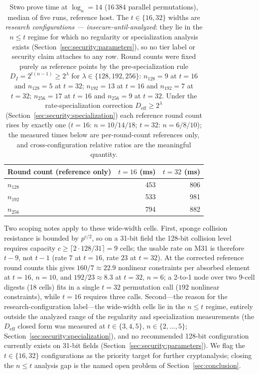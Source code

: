 \documentclass[11pt,a4paper]{article}
\theoremstyle{definition}
\begin{document}
\begin{table}[H]
\centering
\caption{Stwo prove time at $\log_n = 14$ (16\,384 parallel
permutations), median of five runs, reference host. The
$t \in \{16, 32\}$ widths are \emph{research configurations ---
insecure-until-analyzed}: they lie in the $n \le t$ regime for which
no regularity or specialization analysis exists
(Section~\ref{sec:security:parameters}), so no tier label or
security claim attaches to any row. Round counts were fixed purely
as reference points by the pre-specialization rule
$D_I = 2^{t(n-1)} \ge
2^{\lambda}$ for $\lambda \in \{128, 192, 256\}$: $n_{128} = 9$ at
$t=16$ and $n_{128} = 5$ at $t=32$;
$n_{192} = 13$ at $t=16$ and $n_{192} = 7$ at $t=32$;
$n_{256} = 17$ at $t=16$ and $n_{256} = 9$ at $t=32$. Under the
rate-specialization correction $D_{\mathrm{eff}} \ge 2^{\lambda}$
(Section~\ref{sec:security:specialization}) each reference round
count rises by exactly one ($t=16$: $n = 10/14/18$; $t=32$:
$n = 6/8/10$);
the measured times below are per-round-count references only,
and cross-configuration relative ratios are the meaningful quantity.}
\label{tab:perf-stwo}
\small
\begin{tabular}{@{}lrr@{}}
\toprule
Round count (reference only) & $t = 16$ (ms) & $t = 32$ (ms) \\
\midrule
$n_{128}$ & 453 & 806 \\
$n_{192}$ & 533 & 981 \\
$n_{256}$ & 794 & 882 \\
\bottomrule
\end{tabular}
\end{table}

Two scoping notes apply to these wide-width cells. First, sponge
collision resistance is bounded by $p^{c/2}$, so on a 31-bit field
the 128-bit collision level requires capacity
$c \ge \lceil 2 \cdot 128 / 31 \rceil = 9$ cells; the usable rate on
M31 is therefore $t - 9$, not $t - 1$ (rate $7$ at $t = 16$, rate
$23$ at $t = 32$). At the corrected reference round counts this gives
$160/7 \approx 22.9$ nonlinear constraints per absorbed element at
$t = 16$, $n = 10$, and $192/23 \approx 8.3$ at $t = 32$, $n = 6$; a
2-to-1 node over two 9-cell digests (18 cells) fits in a single
$t = 32$ permutation call ($192$ nonlinear constraints), while
$t = 16$ requires three calls. Second---the reason for the
research-configuration label---the wide-width cells lie in
the $n \le t$ regime, entirely outside the analyzed range of the
regularity and specialization measurements (the
$D_{\mathrm{eff}}$ closed form was measured at $t \in \{3, 4, 5\}$,
$n \in \{2, \ldots, 5\}$;
Section~\ref{sec:security:specialization}), and no recommended
128-bit configuration currently exists on 31-bit fields
(Section~\ref{sec:security:parameters}). We flag the
$t \in \{16, 32\}$ configurations as the priority target for further
cryptanalysis; closing the $n \le t$ analysis gap is the named open
problem of Section~\ref{sec:conclusion}.
\end{document}
